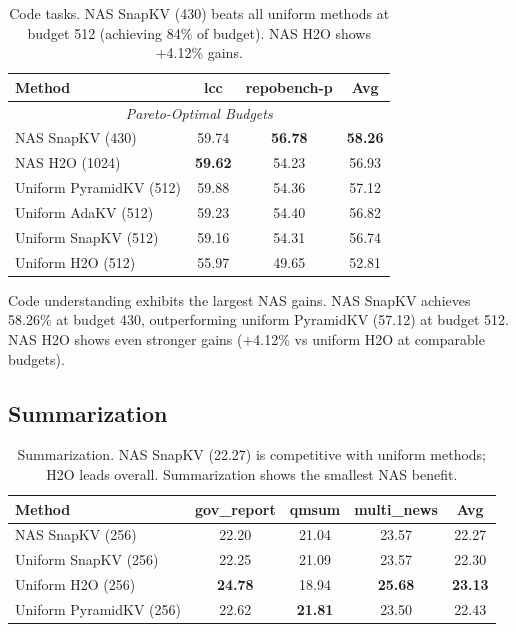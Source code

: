 \documentclass[11pt,a4paper]{article}
\begin{document}
\begin{table}[t]
\centering
\small
\begin{tabular}{l c c c}
\toprule
\textbf{Method} & \textbf{lcc} & \textbf{repobench-p} & \textbf{Avg} \\
\midrule
\multicolumn{4}{c}{\textit{Pareto-Optimal Budgets}} \\
NAS SnapKV (430) & 59.74 & \textbf{56.78} & \textbf{58.26} \\
NAS H2O (1024) & \textbf{59.62} & 54.23 & 56.93 \\
Uniform PyramidKV (512) & 59.88 & 54.36 & 57.12 \\
Uniform AdaKV (512) & 59.23 & 54.40 & 56.82 \\
Uniform SnapKV (512) & 59.16 & 54.31 & 56.74 \\
Uniform H2O (512) & 55.97 & 49.65 & 52.81 \\
\bottomrule
\end{tabular}
\caption{Code tasks. NAS SnapKV (430) beats all uniform methods at budget 512 (achieving 84\% of budget). NAS H2O shows +4.12\% gains.}
\label{tab:code}
\end{table}

Code understanding exhibits the largest NAS gains. NAS SnapKV achieves 58.26\% at budget 430, outperforming uniform PyramidKV (57.12) at budget 512. NAS H2O shows even stronger gains (+4.12\% vs uniform H2O at comparable budgets).

\subsection{Summarization}

\begin{table}[t]
\centering
\small
\begin{tabular}{l c c c c}
\toprule
\textbf{Method} & \textbf{gov\_report} & \textbf{qmsum} & \textbf{multi\_news} & \textbf{Avg} \\
\midrule
NAS SnapKV (256) & 22.20 & 21.04 & 23.57 & 22.27 \\
Uniform SnapKV (256) & 22.25 & 21.09 & 23.57 & 22.30 \\
Uniform H2O (256) & \textbf{24.78} & 18.94 & \textbf{25.68} & \textbf{23.13} \\
Uniform PyramidKV (256) & 22.62 & \textbf{21.81} & 23.50 & 22.43 \\
\bottomrule
\end{tabular}
\caption{Summarization. NAS SnapKV (22.27) is competitive with uniform methods; H2O leads overall. Summarization shows the smallest NAS benefit.}
\label{tab:summarization}
\end{table}
\end{document}
